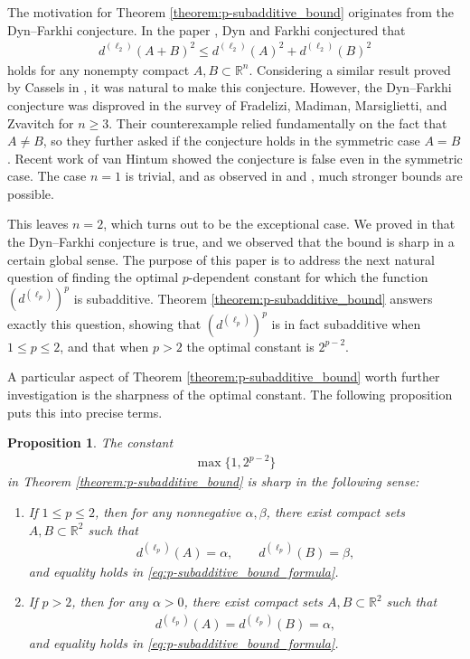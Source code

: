 \documentclass[11pt]{article}
\newtheorem{proposition}{Proposition}[section]
\begin{document}
The motivation for Theorem \ref{theorem:p-subadditive_bound} originates from the Dyn--Farkhi conjecture. In the paper \cite{dyn1}, Dyn and Farkhi conjectured that 
\begin{align*}
    d^{(\ell_2)}(A+B)^2\leq d^{(\ell_2)}(A)^2+d^{(\ell_2)}(B)^2
\end{align*}
holds for any nonempty compact $A,B\subset\mathbb{R}^n$. Considering a similar result proved by Cassels in \cite{cassels1}, it was natural to make this conjecture. However, the Dyn--Farkhi conjecture was disproved in the survey \cite{fradelizi1} of Fradelizi, Madiman, Marsiglietti, and Zvavitch for $n\geq 3$. Their counterexample relied fundamentally on the fact that $A\neq B$, so they further asked if the conjecture holds in the symmetric case $A=B$. Recent work of van Hintum \cite{vanHintum} showed the conjecture is false even in the symmetric case. The case $n=1$ is trivial, and as observed in \cite[Lemma 2.4]{meyer1} and \cite[Theorem 7.5]{fradelizi1}, much stronger bounds are possible.

This leaves $n=2$, which turns out to be the exceptional case. We proved in \cite{meyer2} that the Dyn--Farkhi conjecture is true, and we observed that the bound is sharp in a certain global sense. The purpose of this paper is to address the next natural question of finding the optimal $p$-dependent constant for which the function $(d^{(\ell_p)})^p$ is subadditive. Theorem \ref{theorem:p-subadditive_bound} answers exactly this question, showing that $(d^{(\ell_p)})^p$ is in fact subadditive when $1\leq p\leq 2$, and that when $p>2$ the optimal constant is $2^{p-2}$.

A particular aspect of Theorem \ref{theorem:p-subadditive_bound} worth further investigation is the sharpness of the optimal constant. The following proposition puts this into precise terms.

\begin{proposition}\label{proposition:sharpness_of_constant}
    The constant 
    \begin{align*}
        \max\{1,2^{p-2}\}
    \end{align*}
    in Theorem \ref{theorem:p-subadditive_bound} is sharp in the following sense:
    \begin{enumerate}
        \item If $1\leq p\leq 2$, then for any nonnegative $\alpha,\beta$, there exist compact sets $A,B\subset\mathbb{R}^2$ such that 
        \begin{align*}
            d^{(\ell_p)}(A)=\alpha,\qquad d^{(\ell_p)}(B)=\beta,
        \end{align*}
        and equality holds in \eqref{eq:p-subadditive_bound_formula}.\\
        \item If $p>2$, then for any $\alpha>0$, there exist compact sets $A,B\subset\mathbb{R}^2$ such that 
        \begin{align*}
            d^{(\ell_p)}(A)=d^{(\ell_p)}(B)=\alpha,
        \end{align*}
        and equality holds in \eqref{eq:p-subadditive_bound_formula}.
    \end{enumerate}
\end{proposition}
\end{document}
